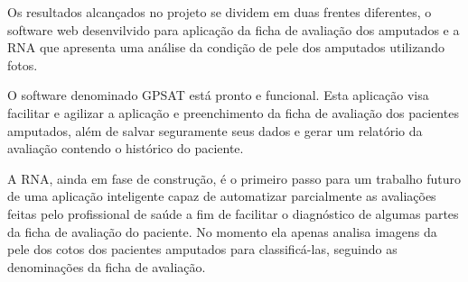 Os resultados alcançados no projeto se dividem em duas frentes diferentes, o software web desenvilvido para aplicação da ficha de avaliação dos amputados e a RNA que apresenta uma análise da condição de pele dos amputados utilizando fotos.

O software denominado GPSAT está pronto e funcional. Esta aplicação visa facilitar e agilizar a aplicação e preenchimento da ficha de avaliação dos pacientes amputados, além de salvar seguramente seus dados e gerar um relatório da avaliação contendo o histórico do paciente.

A RNA, ainda em fase de construção, é o primeiro passo para um trabalho futuro de uma aplicação inteligente capaz de automatizar parcialmente as avaliações feitas pelo profissional de saúde a fim de facilitar o diagnóstico de algumas partes da ficha de avaliação do paciente. No momento ela apenas analisa imagens da pele dos cotos dos pacientes amputados para classificá-las, seguindo as denominações da ficha de avaliação.